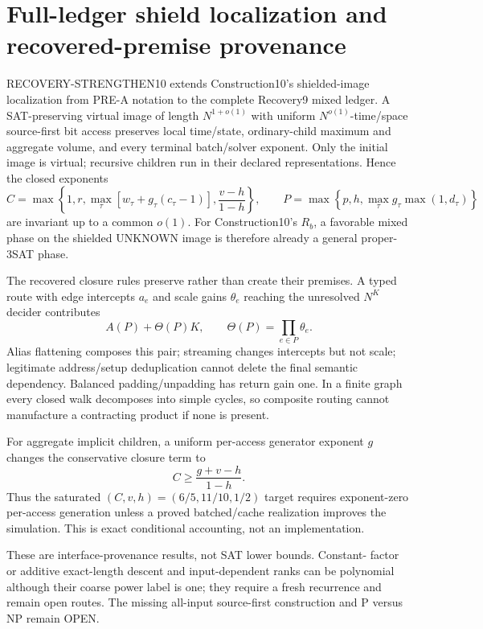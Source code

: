 \section{Full-ledger shield localization and recovered-premise provenance}

RECOVERY-STRENGTHEN10 extends Construction10's shielded-image localization
from PRE-A notation to the complete Recovery9 mixed ledger.  A
SAT-preserving virtual image of length $N^{1+o(1)}$ with uniform
$N^{o(1)}$-time/space source-first bit access preserves local time/state,
ordinary-child maximum and aggregate volume, and every terminal batch/solver
exponent.  Only the initial image is virtual; recursive children run in their
declared representations.  Hence the closed exponents
\[
C=\max\left\{1,r,\max_\tau[w_\tau+g_\tau(c_\tau-1)],
                    \frac{v-h}{1-h}\right\},\qquad
P=\max\left\{p,h,\max_\tau g_\tau\max(1,d_\tau)\right\}
\]
are invariant up to a common $o(1)$.  For Construction10's $R_b$, a
favorable mixed phase on the shielded UNKNOWN image is therefore already a
general proper-3SAT phase.

The recovered closure rules preserve rather than create their premises.  A
typed route with edge intercepts $a_e$ and scale gains $\theta_e$ reaching
the unresolved $N^K$ decider contributes
\[
 A(P)+\Theta(P)K,\qquad
 \Theta(P)=\prod_{e\in P}\theta_e.
\]
Alias flattening composes this pair; streaming changes intercepts but not
scale; legitimate address/setup deduplication cannot delete the final
semantic dependency.  Balanced padding/unpadding has return gain one.  In a
finite graph every closed walk decomposes into simple cycles, so composite
routing cannot manufacture a contracting product if none is present.

For aggregate implicit children, a uniform per-access generator exponent
$g$ changes the conservative closure term to
\[
 C\ge\frac{g+v-h}{1-h}.
\]
Thus the saturated $(C,v,h)=(6/5,11/10,1/2)$ target requires exponent-zero
per-access generation unless a proved batched/cache realization improves the
simulation.  This is exact conditional accounting, not an implementation.

These are interface-provenance results, not SAT lower bounds.  Constant-
factor or additive exact-length descent and input-dependent ranks can be
polynomial although their coarse power label is one; they require a fresh
recurrence and remain open routes.  The missing all-input source-first
construction and P versus NP remain OPEN.

